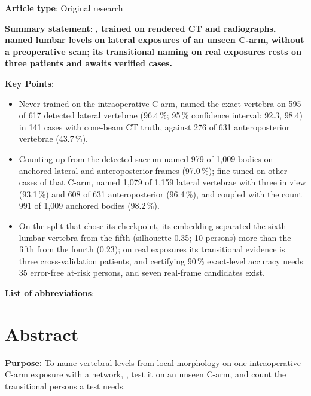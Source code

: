 \textbf{Article type}: Original research

\textbf{Summary statement}: \textbf{\netname{}, trained on rendered CT and radiographs, named lumbar levels on lateral exposures of an unseen C-arm, without a preoperative scan; its transitional naming on real exposures rests on three patients and awaits verified cases.}

\textbf{Key Points}:
\begin{itemize}
\item Never trained on the intraoperative C-arm, \netname{} named the exact vertebra on 595 of 617 detected lateral vertebrae (96.4\,\%; 95\,\% confidence interval: 92.3, 98.4) in 141 cases with cone-beam CT truth, against 276 of 631 anteroposterior vertebrae (43.7\,\%).
\item Counting up from the detected sacrum named 979 of 1,009 bodies on anchored lateral and anteroposterior frames (97.0\,\%); fine-tuned on other cases of that C-arm, \netname{} named 1,079 of 1,159 lateral vertebrae with three in view (93.1\,\%) and 608 of 631 anteroposterior (96.4\,\%), and coupled with the count 991 of 1,009 anchored bodies (98.2\,\%).
\item On the split that chose its checkpoint, its embedding separated the sixth lumbar vertebra from the fifth (silhouette 0.35; 10 persons) more than the fifth from the fourth (0.23); on real exposures its transitional evidence is three cross-validation patients, and certifying 90\,\% exact-level accuracy needs 35 error-free at-risk persons, and seven real-frame candidates exist.
\end{itemize}

\textbf{List of abbreviations}: \printabbreviations

\clearpage
\section*{Abstract}

\textbf{Purpose:} To name vertebral levels from local morphology on one intraoperative C-arm exposure with a network, \netname{}, test it on an unseen C-arm, and count the transitional persons a test needs.

